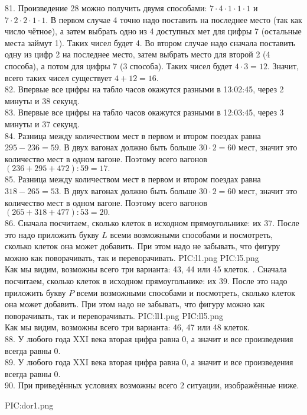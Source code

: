 81. Произведение 28 можно получить двумя способами: $7\cdot4\cdot1\cdot1\cdot1$ и $7\cdot2\cdot2\cdot1\cdot1.$ В первом случае 4 точно надо поставить на последнее место (так как число чётное), а затем выбрать одно из 4 доступных мет для цифры 7 (остальные места займут 1). Таких чисел будет 4. Во втором случае надо сначала поставить одну из цифр 2 на последнее место, затем выбрать место для второй 2 (4 способа), а потом для цифры 7 (3 способа). Таких чисел будет $4\cdot3=12.$ Значит, всего таких чисел существует $4+12=16.$\\
82. Впервые все цифры на табло часов окажутся разными в 13:02:45, через 2 минуты и 38 секунд.\\
83. Впервые все цифры на табло часов окажутся разными в 12:03:45, через 3 минуты и 37 секунд.\\
84. Разница между количеством мест в первом и втором поездах равна $295-236=59.$ В двух вагонах должно быть больше $30\cdot2=60$ мест, значит это количество мест в одном вагоне. Поэтому всего вагонов $(236+295+472):59=17.$\\
85. Разница между количеством мест в первом и втором поездах равна $318-265=53.$ В двух вагонах должно быть больше $30\cdot2=60$ мест, значит это количество мест в одном вагоне. Поэтому всего вагонов $(265+318+477):53=20.$\\
86. Сначала посчитаем, сколько клеток в исходном прямоугольнике: их 37. После это надо приложить букву $L$ всеми возможными способами и посмотреть, сколько клеток она может добавить. При этом надо не забывать, что фигуру можно как поворачивать, так и переворачивать.
{{PIC:l1.png}}
{{PIC:l5.png}}\\
Как мы видим, возможны всего три варианта: 43, 44 или 45 клеток.
\newpage{}. Сначала посчитаем, сколько клеток в исходном прямоугольнике: их 39. После это надо приложить букву $P$ всеми возможными способами и посмотреть, сколько клеток она может добавить. При этом надо не забывать, что фигуру можно как поворачивать, так и переворачивать.
{{PIC:ll1.png}}
{{PIC:ll5.png}}\\
Как мы видим, возможны всего три варианта: 46, 47 или 48 клеток.\\
88. У любого года XXI века вторая цифра равна 0, а значит и все произведения всегда равны 0.\\
89. У любого года XXI века вторая цифра равна 0, а значит и все произведения всегда равны 0.\\
90. При приведённых условиях возможны всего 2 ситуации, изображённые ниже.
\begin{center}
{{PIC:dor1.png}}
\end{center}
